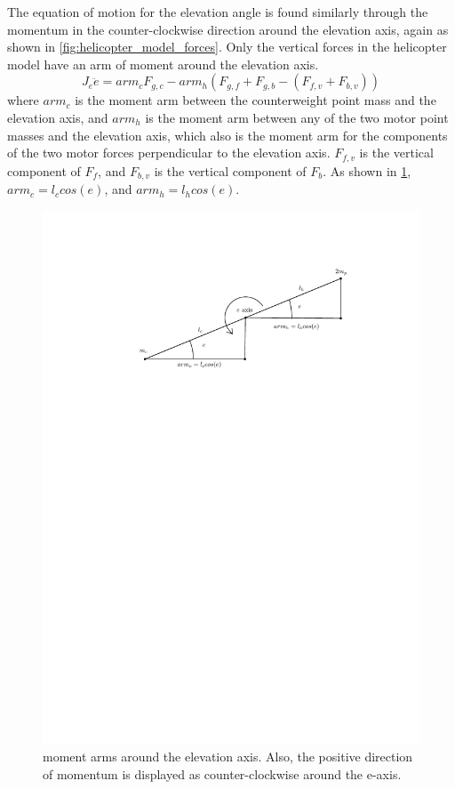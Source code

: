 The equation of motion for the elevation angle is found similarly
through the momentum in the counter-clockwise direction around the
elevation axis, again as shown in
\cref{fig:helicopter_model_forces}. Only the vertical forces in the
helicopter model have an arm of moment around the elevation axis.
%
\begin{equation*}
  J_e\ddot{e} = arm_cF_{g,c} - arm_h(F_{g,f}+F_{g,b} - (F_{f,v} + F_{b,v}))
\end{equation*}
%
where $arm_c$ is the moment arm between the counterweight point mass
and the elevation axis, and $arm_h$ is the moment arm between any of
the two motor point masses and the elevation axis, which also is the
moment arm for the components of the two motor forces perpendicular to
the elevation axis. $F_{f,v}$ is the vertical component of $F_f$, and
$F_{b,v}$ is the vertical component of $F_b$. As shown in
\cref{fig:elevation_model}, $arm_c = l_ccos(e)$, and $arm_h =
l_hcos(e)$.
%
\begin{figure}[H]
  \caption{moment arms around the elevation axis. Also, the positive
    direction of momentum is displayed as counter-clockwise around the
    e-axis.}
  \label{fig:elevation_model}
  \includegraphics[width=1\textwidth]{images/elevation_model}
\end{figure}
